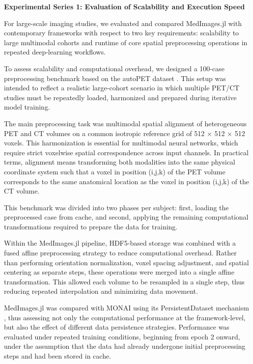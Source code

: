 \documentclass[a4paper,10pt]{elsarticle}
\begin{document}
\textbf{Experimental Series 1: Evaluation of Scalability and Execution Speed}

For large-scale imaging studies, we evaluated and compared MedImages.jl with contemporary frameworks with respect to two key requirements: scalability to large multimodal cohorts and runtime of core spatial preprocessing operations in repeated deep-learning workflows.

To assess scalability and computational overhead, we designed a 100-case preprocessing benchmark based on the autoPET dataset \cite{Dexl_2025}. This setup was intended to reflect a realistic large-cohort scenario in which multiple PET/CT studies must be repeatedly loaded, harmonized and prepared during iterative model training.

The main preprocessing task was multimodal spatial alignment of heterogeneous PET and CT volumes on a common isotropic reference grid of 512 × 512 × 512 voxels. This harmonization is essential for multimodal neural networks, which require strict voxelwise spatial correspondence across input channels. In practical terms, alignment means transforming both modalities into the same physical coordinate system such that a voxel in position (i,j,k) of the PET volume corresponds to the same anatomical location as the voxel in position (i,j,k) of the CT volume.

This benchmark was divided into two phases per subject: first, loading the preprocessed case from cache, and second, applying the remaining computational transformations required to prepare the data for training.

Within the MedImages.jl pipeline, HDF5-based storage was combined with a fused affine preprocessing strategy to reduce computational overhead. Rather than performing orientation normalization, voxel spacing adjustment, and spatial centering as separate steps, these operations were merged into a single affine transformation. This allowed each volume to be resampled in a single step, thus reducing repeated interpolation and minimizing data movement.

MedImages.jl was compared with MONAI using its PersistentDataset mechanism \cite{}, thus assessing not only the computational performance at the framework-level, but also the effect of different data persistence strategies. Performance was evaluated under repeated training conditions, beginning from epoch 2 onward, under the assumption that the data had already undergone initial preprocessing steps and had been stored in cache.
\end{document}

